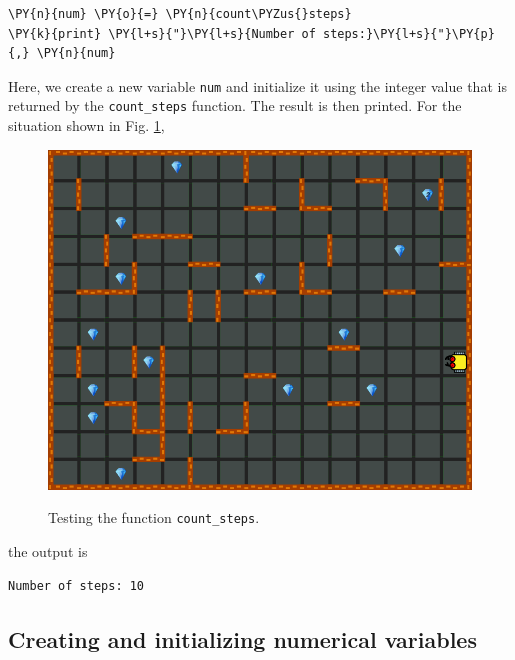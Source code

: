 \begin{bbox}
\begin{Verbatim}[commandchars=\\\{\}]
\PY{n}{num} \PY{o}{=} \PY{n}{count\PYZus{}steps}
\PY{k}{print} \PY{l+s}{"}\PY{l+s}{Number of steps:}\PY{l+s}{"}\PY{p}{,} \PY{n}{num} 
\end{Verbatim}
\end{bbox}
\vspace{6mm}

\noindent
Here, we create a new variable {\tt num} and initialize it using the 
integer value that is returned by the {\tt count\_steps} function.
The result is then printed. For the situation shown in Fig. \ref{fig:cf-1},

\begin{figure}[!ht]
\begin{center}
\includegraphics[height=0.4\textwidth]{img/maze-new-1.png}
\vspace{-0mm}
\caption{Testing the function {\tt count\_steps}.}
\vspace{-1cm}
\label{fig:cf-1}
\end{center}
\end{figure}

\noindent
the output is\\

\begin{ybox}
\begin{verbatim}
Number of steps: 10
\end{verbatim}
\end{ybox}
\vspace{6mm}
\subsection[\ \ Creating and initializing numerical variables]{Creating and initializing numerical variables} \label{par:var}

